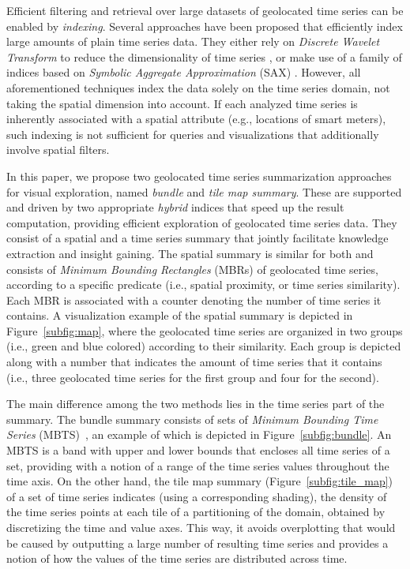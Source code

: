 Efficient filtering and retrieval over large datasets of geolocated time series can be enabled by {\em indexing}. Several approaches have been proposed that efficiently index large amounts of plain time series data. They either rely on \emph{Discrete Wavelet Transform} to reduce the dimensionality of time series \cite{chan1999icde}, or make use of a family of indices based on \emph{Symbolic Aggregate Approximation} (SAX) \cite{shieh2008kdd,camerra2010icdm,camerra2014kais,zoumpatianos2014sigmod}. However, all aforementioned techniques index the data solely on the time series domain, not taking the spatial dimension into account. If each analyzed time series is inherently associated with a spatial attribute (e.g., locations of smart meters), such indexing is not sufficient for queries and visualizations that additionally involve spatial filters.

In this paper, we propose two geolocated time series summarization approaches for visual exploration, named {\em bundle} and {\em tile map summary}. These are supported and driven by two appropriate {\em hybrid} indices that speed up the result computation, providing efficient exploration of geolocated time series data. They consist of a spatial and a time series summary that jointly facilitate knowledge extraction and insight gaining. The spatial summary is similar for both and consists of {\em Minimum Bounding Rectangles} (MBRs) of geolocated time series, according to a specific predicate (i.e., spatial proximity, or time series similarity). Each MBR is associated with a counter denoting the number of time series it contains. A visualization example of the spatial summary is depicted in Figure~\ref{subfig:map}, where the geolocated time series are organized in two groups (i.e., green and blue colored) according to their similarity. Each group is depicted along with a number that indicates the amount of time series that it contains (i.e., three geolocated time series for the first group and four for the second).

The main difference among the two methods lies in the time series part of the summary. The bundle summary consists of sets of {\em Minimum Bounding Time Series} (MBTS)~\cite{chatzig17btsr}, an example of which is depicted in Figure~\ref{subfig:bundle}. An MBTS is a band with upper and lower bounds that encloses all time series of a set, providing with a notion of a range of the time series values throughout the time axis. On the other hand, the tile map summary (Figure~\ref{subfig:tile_map}) of a set of time series indicates (using a corresponding shading), the density of the time series points at each tile of a partitioning of the domain, obtained by discretizing the time and value axes. This way, it avoids overplotting that would be caused by outputting a large number of resulting time series and provides a notion of how the values of the time series are distributed across time.

